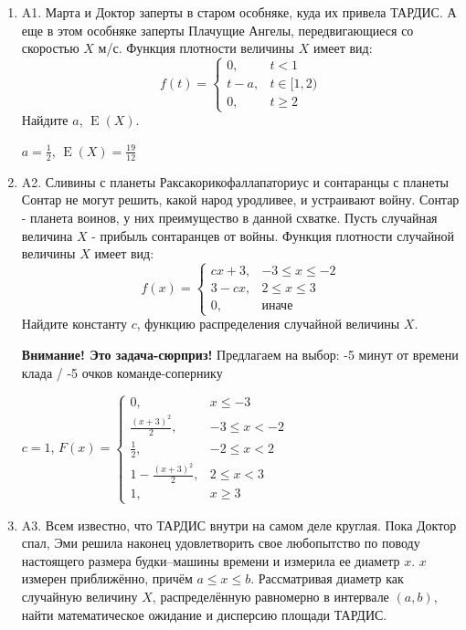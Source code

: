 \documentclass[12pt]{article}
\DeclareMathOperator{\E}{E}
\newenvironment{problem}{}{}
\newenvironment{sol}{}{} %
\begin{document}
\begin{enumerate}
\begin{problem}
\item[A1.] Марта и Доктор заперты в старом особняке, куда их привела ТАРДИС. А еще в этом особняке заперты Плачущие Ангелы, передвигающиеся со скоростью $X$ м/с. Функция плотности величины $X$ имеет вид:
\[
f(t) = \begin{cases}
0, &  t<1 \\
t-a, & t \in [1,2) \\
0, & t \geq 2
\end{cases}
\]
Найдите $a$, $\E(X)$.

\begin{sol}
$a = \frac{1}{2}$, $\E(X) = \frac{19}{12}$
\end{sol}
\end{problem}

\begin{problem}
\item[A2.] Сливины с планеты Раксакорикофаллапаториус и сонтаранцы с планеты Сонтар не могут решить, какой народ уродливее, и устраивают войну. Сонтар - планета воинов, у них преимущество в данной схватке. Пусть случайная величина $X$ - прибыль сонтаранцев от войны.  Функция плотности случайной величины $X$ имеет вид:
\[
f(x) = \begin{cases}
cx +3, & -3 \leq x \leq -2 \\
3-cx, & 2 \leq x \leq 3 \\
0, & \text{иначе}
\end{cases}
\]
Найдите константу $c$, функцию распределения случайной величины $X$.

\begin{sol}
\textbf{Внимание! Это задача-сюрприз!} Предлагаем на выбор: -5 минут от времени клада / -5 очков команде-сопернику

$c=1$, $F(x) = \begin{cases}
0, & x \leq -3 \\
\frac{(x+3)^2}{2}, & -3 \leq x < -2 \\
\frac{1}{2}, & -2 \leq x < 2 \\
1 - \frac{(x+3)^2}{2}, & 2 \leq x < 3 \\
1, & x \geq 3
\end{cases}
$
\end{sol}
\end{problem}

\begin{problem}
\item[A3.] Всем известно, что ТАРДИС внутри на самом деле круглая. Пока Доктор спал, Эми решила наконец удовлетворить свое любопытство по поводу настоящего размера будки–машины времени и измерила ее диаметр $x$. $x$ измерен приближённо, причём $a \leq x \leq b$. Рассматривая диаметр как случайную величину $X$, распределённую равномерно в интервале $(a, b)$, найти математическое ожидание и дисперсию площади ТАРДИС.


\end{problem}
\end{enumerate}
\end{document}
